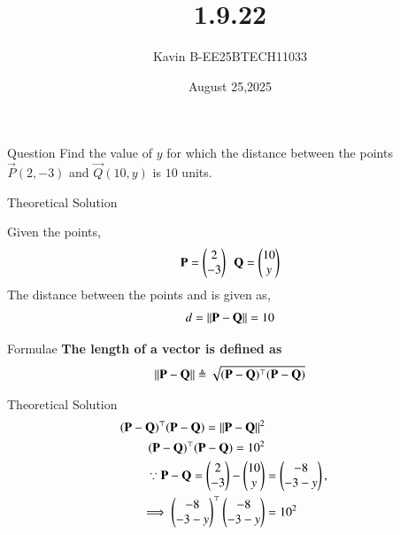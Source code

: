 \documentclass{beamer}
\begin{document}
\title 
{1.9.22}
\date{August 25,2025}


\author 
{Kavin B-EE25BTECH11033}






\frame{\titlepage}
\begin{frame}{Question}
Find the value of $y$ for which the distance between the points $\vec{P}(2,-3)$ and $\vec{Q}(10,y)$ is $10$ units.
\end{frame}



\begin{frame}{Theoretical Solution}

Given the points,
\begin{align}
    \vec{P}=\begin{myvec}{2\\-3}\end{myvec}\ \ 
    \vec{Q}=\begin{myvec}{10\\y}\end{myvec}
\end{align}
The distance between the points  and  is given as,
\begin{align}
d = \left\lVert\mathbf{P}-\mathbf{Q}\right\rVert = 10
\end{align}
\end{frame}

\begin{frame}{Formulae}
\textbf{The length of a vector  is  defined as}
\begin{align}
\label{eq:side-length}
	\left\lVert\mathbf{P}-\mathbf{Q}\right\rVert \triangleq \sqrt{(\mathbf{P}-\mathbf{Q})^{\top}(\mathbf{P}-\mathbf{Q})}
\end{align}
\end{frame}


\begin{frame}{Theoretical Solution}
\begin{align}
            (\mathbf{P}-\mathbf{Q})^\top (\mathbf{P}-\mathbf{Q}) = \left\lVert\mathbf{P}-\mathbf{Q}\right\rVert^2\\
            (\mathbf{P}-\mathbf{Q})^\top (\mathbf{P}-\mathbf{Q}) = 10^2\\
\because
		\mathbf{P} - \mathbf{Q} = \begin{pmatrix}2\\-3\end{pmatrix} - \begin{pmatrix}10\\y\end{pmatrix} &= \begin{pmatrix}-8\\-3-y\end{pmatrix},\\
        \implies\begin{pmatrix}-8\\-3-y\end{pmatrix}^\top\begin{pmatrix}-8\\-3-y\end{pmatrix} &= 10^2
\end{align}

\end{frame}
\end{document}
